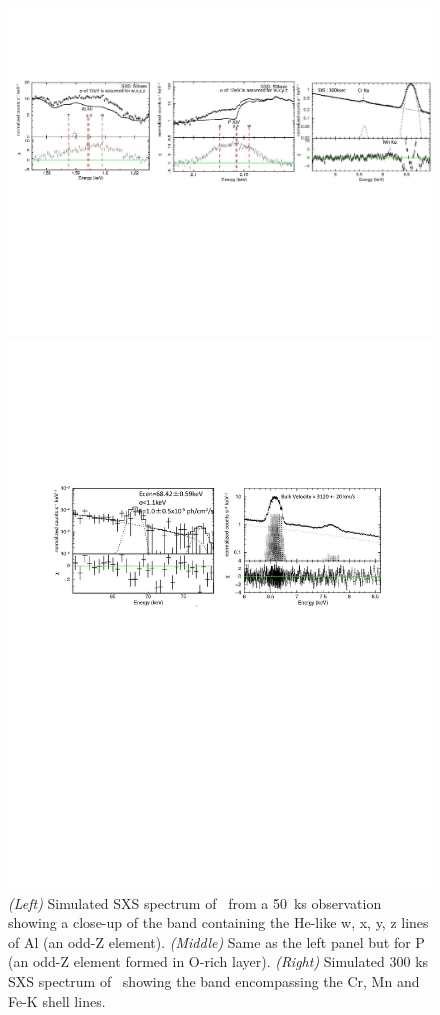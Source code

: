 \documentclass[11pt,a4paper]{article}
\begin{document}
{\begin{figure}
  \begin{center}
 \includegraphics[width=6.5in]{CasA_newFig8.pdf}
  \caption{{\it (Left)}
Simulated SXS spectrum of \casa\ from a 
50~ks observation showing a close-up of the band containing the He-like w, x, y, z lines of Al (an odd-Z element).
 {\it (Middle)} Same as the left panel but for P (an odd-Z element formed in O-rich layer).
  {\it (Right)}
    Simulated 300 ks SXS spectrum of \casa\ showing the band
    encompassing the Cr, Mn and Fe-K shell lines.}
  \label{casa:spectra1}
  \end{center}
  \begin{center}
 \includegraphics[width=5.5in,clip,trim=60 405 70 200]{casa_spectra2}

\end{center}
\end{figure}}
\end{document}
